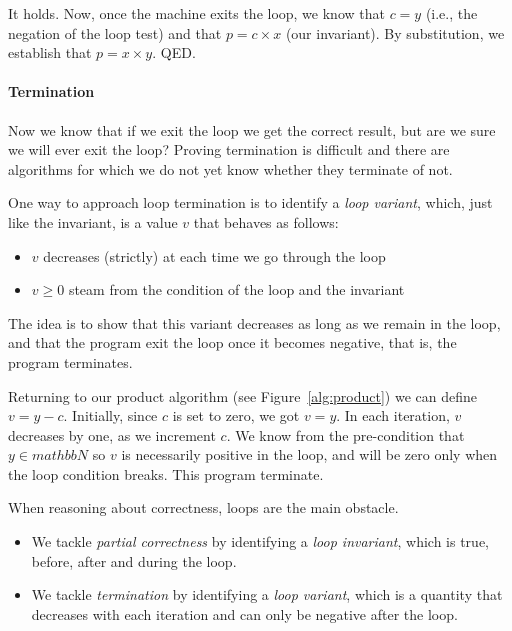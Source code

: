 \documentclass{aldast}
\begin{document}
It holds. Now, once the machine exits the loop, we know that $c = y$
(i.e., the negation of the loop test) and that $p = c \times x$ (our
invariant). By substitution, we establish that $p = x \times y$. QED.

\paragraph{Termination} Now we know that if we exit the loop we get
the correct result, but are we sure we will ever exit the loop?
Proving termination is difficult and there are algorithms for which we
do not yet know whether they terminate of not.

One way to approach loop termination is to identify a \emph{loop
  variant}, which, just like the invariant, is a value $v$ that
behaves as follows:
\begin{itemize}
\item $v$ decreases (strictly) at each time we go through the loop
\item $v \geq 0$ steam from the condition of the loop and the invariant
\end{itemize}

The idea is to show that this variant decreases as long as we remain
in the loop, and that the program exit the loop once it becomes
negative, that is, the program terminates.

Returning to our product algorithm (see Figure~\ref{alg:product}) we
can define $v=y-c$. Initially, since $c$ is set to zero, we got
$v=y$. In each iteration, $v$ decreases by one, as we increment
$c$. We know from the pre-condition that $y \in mathbb{N}$ so $v$ is
necessarily positive in the loop, and will be zero only when the loop
condition breaks. This program terminate.

\begin{takeaway}
  When reasoning about correctness, loops are the main obstacle.
  \begin{itemize}
  \item We tackle \emph{partial correctness} by identifying a
    \emph{loop invariant}, which is true, before, after and during the
    loop.
  \item We tackle \emph{termination} by identifying a \emph{loop
      variant}, which is a quantity that decreases with each iteration
    and can only be negative after the loop.
  \end{itemize}
\end{takeaway}
\end{document}
